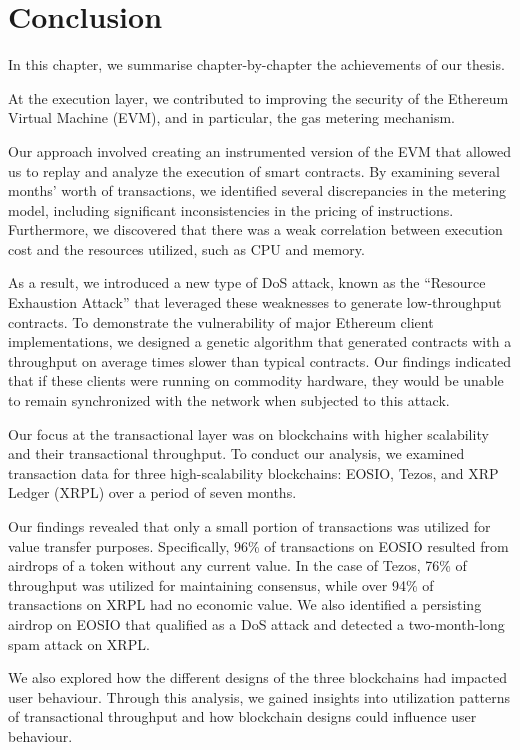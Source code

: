 \chapter{Conclusion}

\label{ch:conclusions}

In this chapter, we summarise chapter-by-chapter the achievements of our thesis.

At the execution layer, we contributed to improving the security of the Ethereum Virtual Machine (EVM), and in particular, the gas metering mechanism.

Our approach involved creating an instrumented version of the EVM that allowed us to replay and analyze the execution of smart contracts.
By examining several months' worth of transactions, we identified several discrepancies in the metering model, including significant inconsistencies in the pricing of instructions.
Furthermore, we discovered that there was a weak correlation between execution cost and the resources utilized, such as CPU and memory.

As a result, we introduced a new type of DoS attack, known as the ``Resource Exhaustion Attack'' that leveraged these weaknesses to generate low-throughput contracts.
To demonstrate the vulnerability of major Ethereum client implementations, we designed a genetic algorithm that generated contracts with a throughput on average \Slowdown times slower than typical contracts.
Our findings indicated that if these clients were running on commodity hardware, they would be unable to remain synchronized with the network when subjected to this attack.

Our focus at the transactional layer was on blockchains with higher scalability and their transactional throughput.
To conduct our analysis, we examined transaction data for three high-scalability blockchains: EOSIO, Tezos, and XRP Ledger (XRPL) over a period of seven months.

Our findings revealed that only a small portion of transactions was utilized for value transfer purposes.
Specifically, 96\% of transactions on EOSIO resulted from airdrops of a token without any current value.
In the case of Tezos, 76\% of throughput was utilized for maintaining consensus, while over 94\% of transactions on XRPL had no economic value. We also identified a persisting airdrop on EOSIO that qualified as a DoS attack and detected a two-month-long spam attack on XRPL.

We also explored how the different designs of the three blockchains had impacted user behaviour.
Through this analysis, we gained insights into utilization patterns of transactional throughput and how blockchain designs could influence user behaviour.

